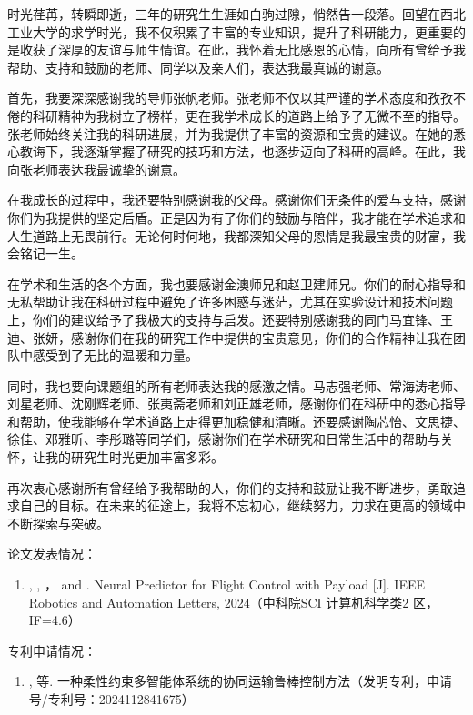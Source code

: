 \documentclass[lang=chs, degree=master, blindreview=false, winfonts=true]{yanputhesis}
\begin{document}
\begin{acknowledgements}                                    %
时光荏苒，转瞬即逝，三年的研究生生涯如白驹过隙，悄然告一段落。回望在西北工业大学的求学时光，我不仅积累了丰富的专业知识，提升了科研能力，更重要的是收获了深厚的友谊与师生情谊。在此，我怀着无比感恩的心情，向所有曾给予我帮助、支持和鼓励的老师、同学以及亲人们，表达我最真诚的谢意。

首先，我要深深感谢我的导师张帆老师。张老师不仅以其严谨的学术态度和孜孜不倦的科研精神为我树立了榜样，更在我学术成长的道路上给予了无微不至的指导。张老师始终关注我的科研进展，并为我提供了丰富的资源和宝贵的建议。在她的悉心教诲下，我逐渐掌握了研究的技巧和方法，也逐步迈向了科研的高峰。在此，我向张老师表达我最诚挚的谢意。

在我成长的过程中，我还要特别感谢我的父母。感谢你们无条件的爱与支持，感谢你们为我提供的坚定后盾。正是因为有了你们的鼓励与陪伴，我才能在学术追求和人生道路上无畏前行。无论何时何地，我都深知父母的恩情是我最宝贵的财富，我会铭记一生。

在学术和生活的各个方面，我也要感谢金澳师兄和赵卫建师兄。你们的耐心指导和无私帮助让我在科研过程中避免了许多困惑与迷茫，尤其在实验设计和技术问题上，你们的建议给予了我极大的支持与启发。还要特别感谢我的同门马宜锋、王迪、张妍，感谢你们在我的研究工作中提供的宝贵意见，你们的合作精神让我在团队中感受到了无比的温暖和力量。

同时，我也要向课题组的所有老师表达我的感激之情。马志强老师、常海涛老师、刘星老师、沈刚辉老师、张夷斋老师和刘正雄老师，感谢你们在科研中的悉心指导和帮助，使我能够在学术道路上走得更加稳健和清晰。还要感谢陶芯怡、文思捷、徐佳、邓雅昕、李彤璐等同学们，感谢你们在学术研究和日常生活中的帮助与关怀，让我的研究生时光更加丰富多彩。

再次衷心感谢所有曾经给予我帮助的人，你们的支持和鼓励让我不断进步，勇敢追求自己的目标。在未来的征途上，我将不忘初心，继续努力，力求在更高的领域中不断探索与突破。
\end{acknowledgements}                                      %
\begin{accomplishments}                                     %
	论文发表情况：
	\begin{enumerate}
		\item {}, , ，  and . Neural Predictor for Flight Control with Payload [J].  IEEE Robotics
		and Automation Letters, 2024（中科院SCI 计算机科学类2 区， IF=4.6）
	\end{enumerate}

    专利申请情况：
    \begin{enumerate}
    	\item {}, 等. 一种柔性约束多智能体系统的协同运输鲁棒控制方法（发明专利，申请号/专利号：2024112841675）
    \end{enumerate}

\end{accomplishments}                                       %
\end{document}
